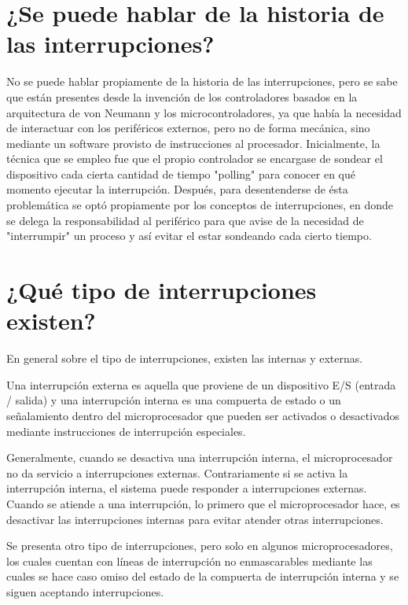 \documentclass[12pt, letter]{article}
\begin{document}
\section*{¿Se puede hablar de la historia de las interrupciones?}

\setlength{\parindent}{31pt}
No se puede hablar propiamente de la historia de las interrupciones, pero se sabe que están presentes desde la invención de los controladores basados en la arquitectura de von Neumann y los microcontroladores, ya que había la necesidad de interactuar con los periféricos externos, pero no de forma mecánica, sino mediante un software provisto de instrucciones al procesador. Inicialmente, la técnica que se empleo fue que el propio controlador se encargase de sondear el dispositivo cada cierta cantidad de tiempo "polling" para conocer en qué momento ejecutar la interrupción. Después, para desentenderse de ésta problemática se optó propiamente por los conceptos de interrupciones, en donde se delega la responsabilidad al periférico para que avise de la necesidad de "interrumpir" un proceso y  así evitar el estar sondeando cada cierto tiempo.

\section*{¿Qué tipo de interrupciones existen?}

\setlength{\parindent}{31pt}
En general sobre el tipo de interrupciones, existen las internas y externas.

\setlength{\parindent}{31pt}
Una interrupción externa es aquella que proviene de un dispositivo E/S (entrada / salida) y una interrupción interna es una compuerta de estado o un señalamiento dentro del microprocesador que pueden ser activados o desactivados mediante instrucciones de interrupción especiales. 

\setlength{\parindent}{31pt}
Generalmente, cuando se desactiva una interrupción interna, el microprocesador no da servicio a interrupciones externas. Contrariamente si se activa la interrupción interna, el sistema puede responder a interrupciones externas. Cuando se atiende a una interrupción, lo primero que el microprocesador hace, es desactivar las interrupciones internas para evitar atender otras interrupciones.

\setlength{\parindent}{31pt}
Se presenta otro tipo de interrupciones, pero solo en algunos microprocesadores, los cuales cuentan con líneas de interrupción no enmascarables mediante las cuales se hace caso omiso del estado de la compuerta de interrupción interna y se siguen aceptando interrupciones.
\end{document}
